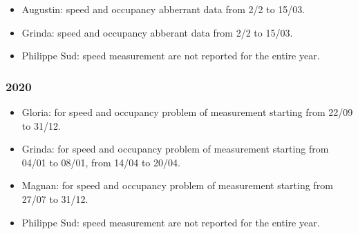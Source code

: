 \documentclass[11pt]{article}
\begin{document}
    \begin{itemize}
\item
  Augustin: speed and occupancy abberrant data from 2/2 to 15/03.
\item
  Grinda: speed and occupancy abberant data from 2/2 to 15/03.
\item
  Philippe Sud: speed measurement are not reported for the entire year.
\end{itemize}

    \hypertarget{section}{%
\subsubsection{2020}\label{section}}

    \begin{itemize}
\item
  Gloria: for speed and occupancy problem of measurement starting from
  22/09 to 31/12.
\item
  Grinda: for speed and occupancy problem of measurement starting from
  04/01 to 08/01, from 14/04 to 20/04.
\item
  Magnan: for speed and occupancy problem of measurement starting from
  27/07 to 31/12.
\item
  Philippe Sud: speed measurement are not reported for the entire year.
\end{itemize}

    




    
    
    
\end{document}

